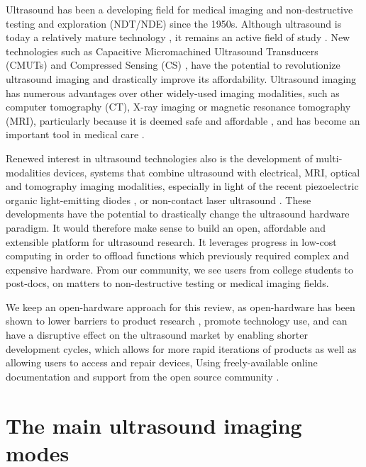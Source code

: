 \documentclass{article}
\begin{document}
Ultrasound has been a developing field for medical imaging and non-destructive testing and exploration (NDT/NDE) since the 1950s. Although ultrasound is today a relatively mature technology \cite{kjeken_systematic_2011}, it remains an active field of study \cite{lanza_ultrasound_2020}. 
New technologies such as Capacitive Micromachined Ultrasound Transducers (CMUTs) and Compressed Sensing (CS) \cite{kruizinga_compressive_2017, liebgott_compressive_2012}, have the potential to revolutionize ultrasound imaging and drastically improve its affordability. Ultrasound imaging has numerous advantages over other widely-used imaging modalities, such as computer tomography (CT), X-ray imaging or magnetic resonance tomography (MRI), particularly because it is deemed safe and affordable \cite{kurjak_use_1986}, and has become an important tool in medical care \cite{wang_anatomy_2020}. 

Renewed interest in ultrasound technologies also is the development of multi-modalities devices, systems that combine ultrasound with electrical, MRI, optical and tomography imaging modalities, especially in light of the recent piezoelectric organic light-emitting diodes \cite{yu_direct_2020}, or non-contact laser ultrasound \cite{zhang_full_2019}. These developments have the potential to drastically change the ultrasound hardware paradigm. It would therefore make sense to build an open, affordable and extensible platform for ultrasound research. It leverages progress in low-cost computing in order to offload functions which previously required complex and expensive hardware. From our community, we see users from college students to post-docs, on matters to non-destructive testing or medical imaging fields.

We keep an open-hardware approach for this review, as open-hardware has been shown to lower barriers to product research \cite{pandey_open_2019}, promote technology use, and  can have a disruptive effect on the ultrasound market by enabling shorter development cycles, which allows for more rapid iterations of products \cite{pearce_quantifying_2015, pearce_return_2016, moritz_economic_2019, winter_open_2019} as well as allowing users to access and repair devices, Using freely-available online documentation and support from the open source community \cite{gibney_open-hardware_2016}. 

\section{The main ultrasound imaging modes}
\end{document}
